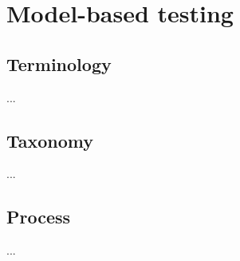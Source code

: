 \chapter{Model-based testing}
\label{cha:modelbasedtesting}
\section{Terminology}
\label{sec:terminology}

...


\section{Taxonomy}
\label{sec:taxonomy}

...


\section{Process}
\label{sec:process}

...



